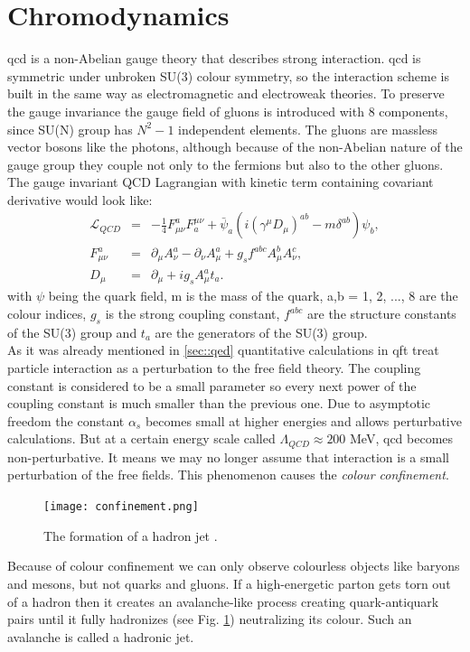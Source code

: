 \section{Chromodynamics}
\gls{qcd} is a non-Abelian gauge theory that describes strong interaction. \gls{qcd} is symmetric under unbroken SU(3) colour symmetry, so the interaction scheme is built in the same way as electromagnetic and electroweak theories. To preserve the gauge invariance the gauge field of gluons is introduced with 8 components, since SU(N) group has $N^2-1$ independent elements. The gluons are massless vector bosons like the photons, although because of the non-Abelian nature of the gauge group they couple not only to the fermions but also to the other gluons. The gauge invariant QCD Lagrangian with kinetic term containing covariant derivative would look like:
\begin{equation}
\begin{array}{lll} 
	\mathcal{L}_{QCD} &=& -\frac{1}{4}F^a_{\mu\nu}F_a^{\mu\nu} + \bar\psi_a(i(\gamma^{\mu}D_{\mu})^{ab} - m\delta^{ab})\psi_b,\\
	F^a_{\mu\nu}  &=& \partial_{\mu}A_{\nu}^a-\partial_{\nu}A^a_{\mu}+g_sf^{abc}A^b_{\mu}A^c_{\nu},\\
	D_{\mu} &=& \partial_{\mu} + ig_s A_{\mu}^at_a.
\end{array} 
\end{equation}
with $\psi$ being the quark field, m is the mass of the quark, a,b = 1, 2, ..., 8 are the colour indices, $g_s$ is the strong coupling constant, $f^{abc}$ are the structure constants of the SU(3) group and $t_a$ are the generators of the SU(3) group. \\
As it was already mentioned in \ref{sec::qed} quantitative calculations in \gls{qft} treat particle interaction as a perturbation to the free field theory. The coupling constant is considered to be a small parameter so every next power of the coupling constant is much smaller than the previous one. Due to asymptotic freedom the constant $\alpha_s$ becomes small at higher energies and allows perturbative calculations. But at a certain energy scale called $\Lambda_{QCD}\approx200$ MeV, \gls{qcd} becomes non-perturbative. It means we may no longer assume that interaction is a small perturbation of the free fields. This phenomenon causes the \textit{colour confinement}.

	 \begin{figure}[htpb]
	 	\centering
	\texttt{[image: confinement.png]}
	\caption{The formation of a hadron jet \cite{conf_wiki}. }
	\label{fig::jet}
	\end{figure}
Because of colour confinement we can only observe colourless objects like baryons and mesons, but not quarks and gluons. If a high-energetic parton gets torn out of a hadron then it creates an avalanche-like process creating quark-antiquark pairs until it fully hadronizes (see Fig. \ref{fig::jet}) neutralizing its colour. Such an avalanche is called a hadronic jet. 

